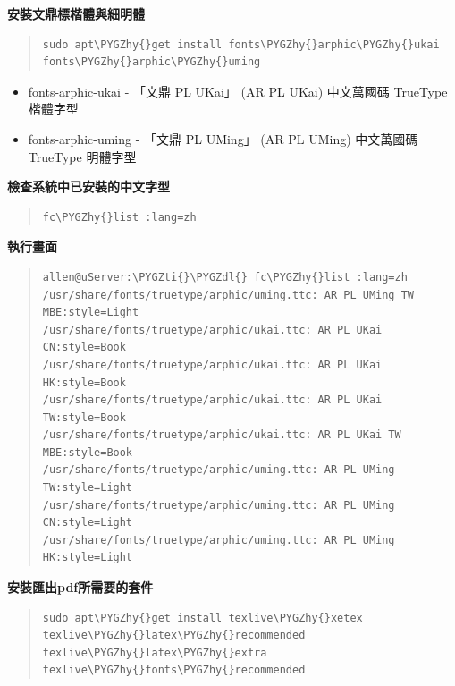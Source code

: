 \documentclass[letterpaper,10pt,english]{sphinxmanual}
\def\PYGZdl{\char`\$}
\def\PYGZhy{\char`\-}
\def\PYGZti{\char`\~}
\begin{document}
\textbf{安裝文鼎標楷體與細明體}
\begin{quote}

\begin{Verbatim}[commandchars=\\\{\}]
sudo apt\PYGZhy{}get install fonts\PYGZhy{}arphic\PYGZhy{}ukai fonts\PYGZhy{}arphic\PYGZhy{}uming
\end{Verbatim}
\end{quote}
\begin{itemize}
\item {} 
fonts-arphic-ukai - 「文鼎 PL UKai」 (AR PL UKai) 中文萬國碼 TrueType 楷體字型

\item {} 
fonts-arphic-uming - 「文鼎 PL UMing」 (AR PL UMing) 中文萬國碼 TrueType 明體字型

\end{itemize}

\textbf{檢查系統中已安裝的中文字型}
\begin{quote}

\begin{Verbatim}[commandchars=\\\{\}]
fc\PYGZhy{}list :lang=zh
\end{Verbatim}
\end{quote}

\textbf{執行畫面}
\begin{quote}

\begin{Verbatim}[commandchars=\\\{\}]
allen@uServer:\PYGZti{}\PYGZdl{} fc\PYGZhy{}list :lang=zh
/usr/share/fonts/truetype/arphic/uming.ttc: AR PL UMing TW MBE:style=Light
/usr/share/fonts/truetype/arphic/ukai.ttc: AR PL UKai CN:style=Book
/usr/share/fonts/truetype/arphic/ukai.ttc: AR PL UKai HK:style=Book
/usr/share/fonts/truetype/arphic/ukai.ttc: AR PL UKai TW:style=Book
/usr/share/fonts/truetype/arphic/ukai.ttc: AR PL UKai TW MBE:style=Book
/usr/share/fonts/truetype/arphic/uming.ttc: AR PL UMing TW:style=Light
/usr/share/fonts/truetype/arphic/uming.ttc: AR PL UMing CN:style=Light
/usr/share/fonts/truetype/arphic/uming.ttc: AR PL UMing HK:style=Light
\end{Verbatim}
\end{quote}

\textbf{安裝匯出pdf所需要的套件}
\begin{quote}

\begin{Verbatim}[commandchars=\\\{\}]
sudo apt\PYGZhy{}get install texlive\PYGZhy{}xetex texlive\PYGZhy{}latex\PYGZhy{}recommended texlive\PYGZhy{}latex\PYGZhy{}extra texlive\PYGZhy{}fonts\PYGZhy{}recommended
\end{Verbatim}
\end{quote}
\end{document}
